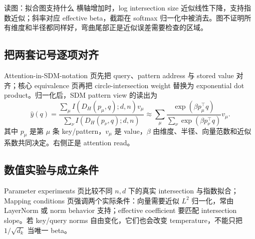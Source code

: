 
\begin{knowledgebox}{读图：拟合图支持什么}
横轴增加时，log intersection size 近似线性下降，支持指数近似；斜率对应 effective beta，截距在 softmax 归一化中被消去。图不证明所有维度和半径都同样好，弯曲尾部正是近似误差需要检查的区域。
\end{knowledgebox}

\subsection{把两套记号逐项对齐}

Attention-in-SDM-notation 页先把 query、pattern address 与 stored value 对齐；核心 equivalence 页再把 circle-intersection weight 替换为 exponential dot product。归一化后，SDM pattern view 的读出为
$$
\hat y(q)
=\frac{\sum_\mu I(D_H(p_\mu,q);d,n)v_\mu}
{\sum_\nu I(D_H(p_\nu,q);d,n)}
\approx
\sum_\mu
\frac{\exp(\beta p_\mu^{\top}q)}
{\sum_\nu\exp(\beta p_\nu^{\top}q)}v_\mu.
$$
其中 $p_\mu$ 是第 $\mu$ 条 key/pattern，$v_\mu$ 是 value，$\beta$ 由维度、半径、向量范数和近似系数共同决定。右侧正是 attention read。



\subsection{数值实验与成立条件}

Parameter experiments 页比较不同 $n,d$ 下的真实 intersection 与指数拟合；Mapping conditions 页强调两个实际条件：向量需要近似 $L^2$ 归一化，常由 LayerNorm 或 norm behavior 支持；effective coefficient 要匹配 intersection slope。若 key/query norms 自由变化，它们也会改变 temperature，不能只把 $1/\sqrt{d_k}$ 当唯一 beta。



